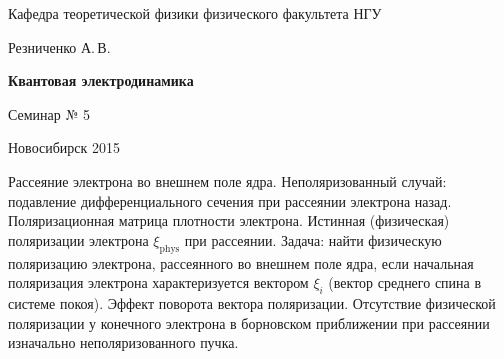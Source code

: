 \documentclass[12pt,pagesize,paper=192mm:108mm]{scrbook}
\begin{document}
\begin{titlepage}
\begin{center}
    Кафедра теоретической физики физического факультета НГУ
    \medskip

    \Large
    Резниченко А.\,В.
    \bigskip

    \huge
    \textbf{Квантовая электродинамика}
    \bigskip

    \Large
    Семинар № 5
    \vfill

    \normalsize
    \vfill

    \normalsize \ccbysa\hspace{0.5em}  Новосибирск 2015
  \end{center}
\end{titlepage}
\newpage

\vspace*{-1em}
\begin{center}
\vfill
  \begin{minipage}{0.65\linewidth}
    Рассеяние электрона во внешнем поле ядра.  Неполяризованный
    случай: подавление дифференциального сечения при рассеянии
    электрона назад. Поляризационная матрица плотности
    электрона. Истинная (физическая) поляризации электрона
    $\xi_{\text{phys}}$ при рассеянии. Задача: найти физическую
    поляризацию электрона, рассеянного во внешнем поле ядра, если
    начальная поляризация электрона характеризуется вектором $\xi_i$
    (вектор среднего спина в системе покоя). Эффект поворота вектора
    поляризации. Отсутствие физической поляризации у конечного
    электрона в борновском приближении при рассеянии изначально
    неполяризованного пучка.
  \end{minipage}
  \vfill

\end{center}
\end{document}

